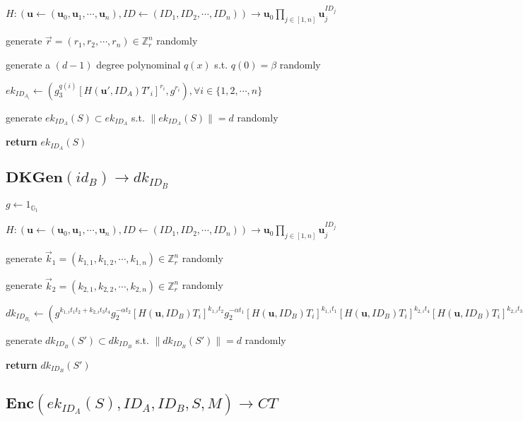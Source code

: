 \documentclass[a4paper]{article}
\begin{document}
$H: (\bm{u} \gets (\bm{u}_0, \bm{u}_1, \cdots, \bm{u}_n), \textit{ID} \gets (\textit{ID}_1, \textit{ID}_2, \cdots, \textit{ID}_n)) \rightarrow \bm{u}_0\prod\limits_{j \in [1, n]} \bm{u}_j^{\textit{ID}_j}$

generate $\vec{r} = (r_1, r_2, \cdots, r_n) \in \mathbb{Z}_r^n$ randomly

generate a $(d - 1)$ degree polynominal $q(x)$ s.t. $q(0) = \beta$ randomly

$\textit{ek}_{\textit{ID}_{A_i}} \gets (g_3^{q(i)} [H(\bm{u}', \textit{ID}_A)T'_i]^{r_i}, g^{r_i}), \forall i \in \{1, 2, \cdots, n\}$

generate $\textit{ek}_{\textit{ID}_A}(S) \subset \textit{ek}_{\textit{ID}_A}$ s.t. $\|\textit{ek}_{\textit{ID}_A}(S)\| = d$ randomly

\textbf{return} $\textit{ek}_{\textit{ID}_A}(S)$

\subsection{$\textbf{DKGen}(\textit{id}_B) \rightarrow \textit{dk}_{\textit{ID}_B}$}

$g \gets 1_{\mathbb{G}_1}$

$H: (\bm{u} \gets (\bm{u}_0, \bm{u}_1, \cdots, \bm{u}_n), \textit{ID} \gets (\textit{ID}_1, \textit{ID}_2, \cdots, \textit{ID}_n)) \rightarrow \bm{u}_0\prod\limits_{j \in [1, n]} \bm{u}_j^{\textit{ID}_j}$

generate $\vec{k}_1 = (k_{1, 1}, k_{1, 2}, \cdots, k_{1, n}) \in \mathbb{Z}_r^n$ randomly

generate $\vec{k}_2 = (k_{2, 1}, k_{2, 2}, \cdots, k_{2, n}) \in \mathbb{Z}_r^n$ randomly

$\textit{dk}_{\textit{ID}_{B_i}} \gets (
g^{k_{1, i} t_1 t_2 + k_{2, i} t_3 t_4}
g_2^{-\alpha t_2} [H(\bm{u}, \textit{ID}_B) T_i]^{k_{1, i} t_2}
g_2^{-\alpha t_1} [H(\bm{u}, \textit{ID}_B) T_i]^{k_{1, i} t_1}
[H(\bm{u}, \textit{ID}_B) T_i]^{k_{2, i} t_4}
[H(\bm{u}, \textit{ID}_B) T_i]^{k_{2, i} t_3}
), \forall i \in \{1, 2, \cdots, n\}
$

generate $\textit{dk}_{\textit{ID}_B}(S') \subset \textit{dk}_{\textit{ID}_B}$ s.t. $\|\textit{dk}_{\textit{ID}_B}(S')\| = d$ randomly

\textbf{return} $\textit{dk}_{\textit{ID}_B}(S')$

\subsection{$\textbf{Enc}(\textit{ek}_{\textit{ID}_A}(S), \textit{ID}_A, \textit{ID}_B, S, M) \rightarrow \textit{CT}$}
\end{document}
